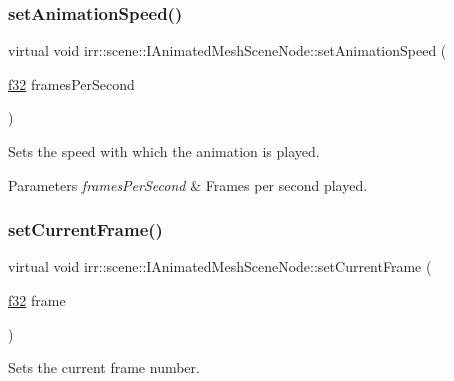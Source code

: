 \subsubsection{\texorpdfstring{set\+Animation\+Speed()}{setAnimationSpeed()}\hspace{0.1cm}{\footnotesize\ttfamily [2/2]}}
{\footnotesize\ttfamily virtual void irr\+::scene\+::\+I\+Animated\+Mesh\+Scene\+Node\+::set\+Animation\+Speed (\begin{DoxyParamCaption}\item[{\hyperlink{namespaceirr_a0277be98d67dc26ff93b1a6a1d086b07}{f32}}]{frames\+Per\+Second }\end{DoxyParamCaption})\hspace{0.3cm}{\ttfamily [pure virtual]}}



Sets the speed with which the animation is played. 


\begin{DoxyParams}{Parameters}
{\em frames\+Per\+Second} & Frames per second played. \\
\hline
\end{DoxyParams}
\mbox{\label{classirr_1_1scene_1_1IAnimatedMeshSceneNode_aff1c1e2270f4d3d94e58e7c130c575a4}} 
\subsubsection{\texorpdfstring{set\+Current\+Frame()}{setCurrentFrame()}\hspace{0.1cm}{\footnotesize\ttfamily [1/2]}}
{\footnotesize\ttfamily virtual void irr\+::scene\+::\+I\+Animated\+Mesh\+Scene\+Node\+::set\+Current\+Frame (\begin{DoxyParamCaption}\item[{\hyperlink{namespaceirr_a0277be98d67dc26ff93b1a6a1d086b07}{f32}}]{frame }\end{DoxyParamCaption})\hspace{0.3cm}{\ttfamily [pure virtual]}}



Sets the current frame number. 

